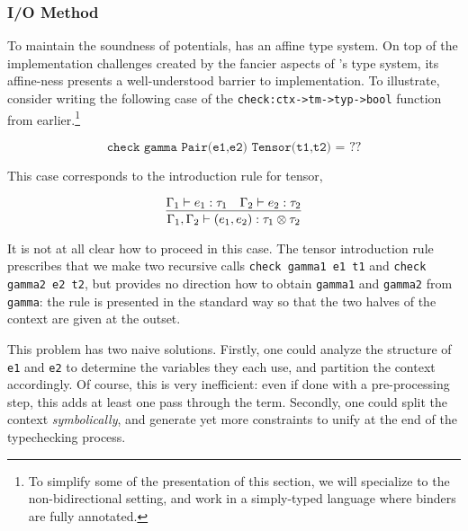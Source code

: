 
\subsubsection{I/O Method}
\label{sec:bilambdaamor-overview-io}
To maintain the soundness of potentials, \dlambdaamor has an affine type system. On top of the implementation challenges created by the fancier aspects of \dlambdaamor's type system, its affine-ness presents a well-understood barrier to implementation. To illustrate, consider writing the following case of the \texttt{check:ctx->tm->typ->bool} function from earlier.\footnote{
To simplify some of the presentation of this section, we will specialize to the non-bidirectional setting, and work in a simply-typed language where binders are fully annotated.
}

$$
\texttt{check gamma Pair(e1,e2) Tensor(t1,t2) = } ??
$$

This case corresponds to the introduction rule for tensor,

$$
\infer{\Gamma_1,\Gamma_2 \vdash (e_1,e_2) : \tau_1 \otimes \tau_2}{\Gamma_1 \vdash e_1 : \tau_1 & \Gamma_2 \vdash e_2 : \tau_2}
$$


It is not at all clear how to proceed in this case. The tensor introduction rule prescribes that we make two recursive calls \texttt{check gamma1 e1 t1} and \texttt{check gamma2 e2 t2}, but provides no direction how to obtain \texttt{gamma1} and \texttt{gamma2} from \texttt{gamma}: the rule is presented in the standard way so that the two halves of the context are given at the outset.

This problem has two naive solutions. Firstly, one could analyze the structure of \texttt{e1} and \texttt{e2} to determine the variables they each use, and partition the context accordingly. Of course, this is very inefficient: even if done with a pre-processing step, this adds at least one pass through the term. Secondly, one could split the context \textit{symbolically}, and generate yet more constraints to unify at the end of the typechecking process.

